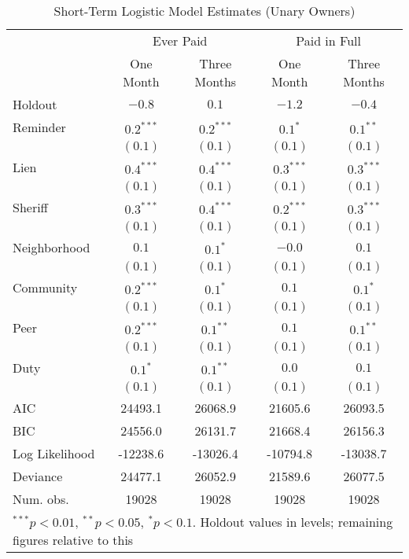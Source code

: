 \begin{appendices}
\begin{table}[htbp]
\caption{Short-Term Logistic Model Estimates (Unary Owners)}\label{sh_logit}
\begin{center}
\begin{adjustbox}{width=\textwidth,totalheight=0.9\textheight,keepaspectratio}
\begin{tabular}{l c c c c }
\hline
 & \multicolumn{2}{c}{Ever Paid} & \multicolumn{2}{c}{Paid in Full} \\
 & One Month & Three Months & One Month & Three Months \\
Holdout        & $-0.8$ & $0.1$       & $-1.2$ & $-0.4$ \\
\hline
Reminder        & $0.2^{***}$  & $0.2^{***}$ & $0.1^{*}$    & $0.1^{**}$   \\
               & $(0.1)$      & $(0.1)$     & $(0.1)$      & $(0.1)$      \\
Lien           & $0.4^{***}$  & $0.4^{***}$ & $0.3^{***}$  & $0.3^{***}$  \\
               & $(0.1)$      & $(0.1)$     & $(0.1)$      & $(0.1)$      \\
Sheriff        & $0.3^{***}$  & $0.4^{***}$ & $0.2^{***}$  & $0.3^{***}$  \\
               & $(0.1)$      & $(0.1)$     & $(0.1)$      & $(0.1)$      \\
Neighborhood   & $0.1$        & $0.1^{*}$   & $-0.0$       & $0.1$        \\
               & $(0.1)$      & $(0.1)$     & $(0.1)$      & $(0.1)$      \\
Community      & $0.2^{***}$  & $0.1^{*}$   & $0.1$        & $0.1^{*}$    \\
               & $(0.1)$      & $(0.1)$     & $(0.1)$      & $(0.1)$      \\
Peer           & $0.2^{***}$  & $0.1^{**}$  & $0.1$        & $0.1^{**}$   \\
               & $(0.1)$      & $(0.1)$     & $(0.1)$      & $(0.1)$      \\
Duty           & $0.1^{*}$    & $0.1^{**}$  & $0.0$        & $0.1$        \\
               & $(0.1)$      & $(0.1)$     & $(0.1)$      & $(0.1)$      \\
\hline
AIC            & 24493.1      & 26068.9     & 21605.6      & 26093.5      \\
BIC            & 24556.0      & 26131.7     & 21668.4      & 26156.3      \\
Log Likelihood & -12238.6     & -13026.4    & -10794.8     & -13038.7     \\
Deviance       & 24477.1      & 26052.9     & 21589.6      & 26077.5      \\
Num. obs.      & 19028        & 19028       & 19028        & 19028        \\
\hline
\multicolumn{5}{l}{\scriptsize{$^{***}p<0.01$, $^{**}p<0.05$,
    $^*p<0.1$. Holdout values in levels; remaining figures relative to
    this}}
\end{tabular}
\end{adjustbox}
\end{center}
\end{table}


\end{appendices}
